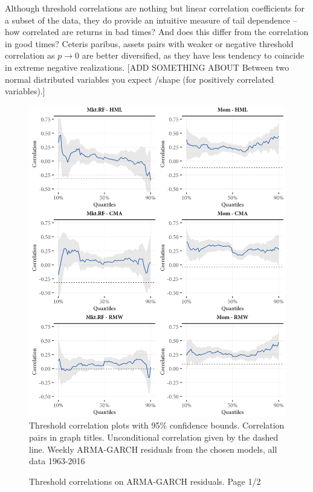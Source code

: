 Although threshold correlations are nothing but linear correlation coefficients for a subset of the data, they do provide an intuitive measure of tail dependence -- how correlated are returns in bad times? And does this differ from the correlation in good times? Ceteris paribus, assets pairs with weaker or negative threshold correlation as $p \rightarrow 0$ are better diversified, as they have less tendency to coincide in extreme negative realizations. [ADD SOMETHING ABOUT Between two normal distributed variables you expect /\-shape (for positively correlated variables).]

\begin{figure}[htbp]
  \caption{Threshold correlations on ARMA-GARCH residuals. Page 1/2}
  \label{fig:threshold1}
  \centering
  \begin{minipage}{\textwidth}
  \includegraphics[scale=1]{graphics/threshold1.png}  
  \vspace{3mm}
  \footnotesize
  Threshold correlation plots with 95\% confidence bounds. Correlation pairs in graph titles. Unconditional correlation given by the dashed line. Weekly ARMA-GARCH residuals from the chosen models, all data 1963-2016
  \end{minipage}
\end{figure}
